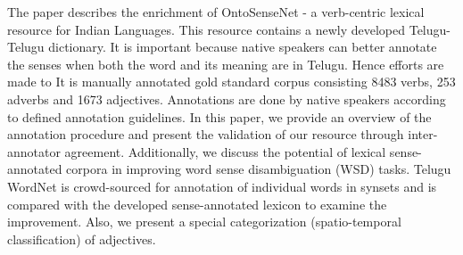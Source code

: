 The paper describes the enrichment of OntoSenseNet - a verb-centric lexical resource for Indian Languages. This resource contains a newly developed Telugu-Telugu dictionary. It is important because native speakers can better annotate the senses when both the word and its meaning are in Telugu. Hence efforts are made to It is manually annotated gold standard corpus consisting 8483 verbs, 253 adverbs and 1673 adjectives. Annotations are done by native speakers according to defined annotation guidelines. In this paper, we provide an overview of the annotation procedure and present the validation of our resource through inter-annotator agreement. Additionally, we discuss the potential of lexical sense-annotated corpora in improving word sense disambiguation (WSD) tasks. Telugu WordNet is crowd-sourced for annotation of individual words in synsets and is compared with the developed sense-annotated lexicon to examine the improvement. Also, we present a special categorization (spatio-temporal classification) of adjectives.
